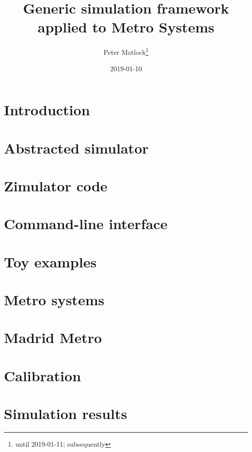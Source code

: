 \documentclass[10pt,notitlepage]{report}
\title{Generic simulation framework \\applied to Metro Systems}
\author{Peter Matlock\footnote{\email{pmatlock@sg.ibm.com} until 2019-01-11; subsequently \email{pwm@induulge.net}}}
\affil{IBM Research, Singapore}
\date{2019-01-10}
\begin{document}
\maketitle

\abstract{

}

\tableofcontents
\newpage

\chapter{Introduction}


\chapter{Abstracted simulator}
\label{Chap:Zim}


\chapter{Zimulator code}
\label{Chap:ZimCode}


\chapter{Command-line interface}
\label{Chap:CLI}


\chapter{Toy examples}
\label{Chap:SysExm}


\chapter{Metro systems}
\label{Chap:Metro}


\chapter{Madrid Metro}
\label{Chap:Madrid}


\chapter{Calibration}
\label{Chap:MadCali}


\chapter{Simulation results}
\label{Chap:MadResu}

\end{document}
